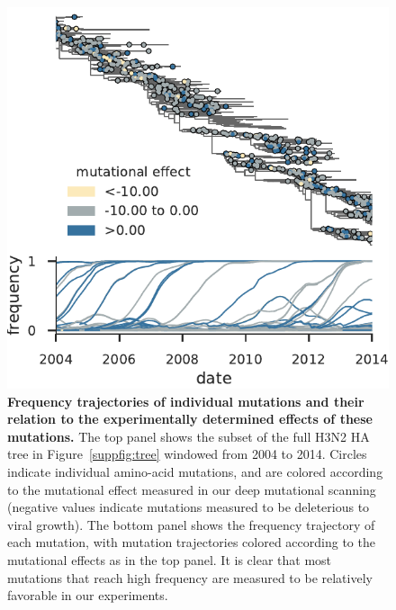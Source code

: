 \documentclass[9pt,twocolumn,twoside]{pnas-new}
\begin{document}
\begin{figure}[h!]
\centering
\includegraphics[width=\linewidth]{figs/frequency_trajectory_ex.pdf}
\caption{\label{fig:frequency_trajectory}
{\bf Frequency trajectories of individual mutations and their relation to the experimentally determined effects of these mutations.}
The top panel shows the subset of the full H3N2 HA tree in Figure~\ref{suppfig:tree} windowed from 2004 to 2014.
Circles indicate individual amino-acid mutations, and are colored according to the mutational effect measured in our deep mutational scanning (negative values indicate mutations measured to be deleterious to viral growth).
The bottom panel shows the frequency trajectory of each mutation, with mutation trajectories colored according to the mutational effects as in the top panel.
It is clear that most mutations that reach high frequency are measured to be relatively favorable in our experiments.
}
\end{figure}
\end{document}
